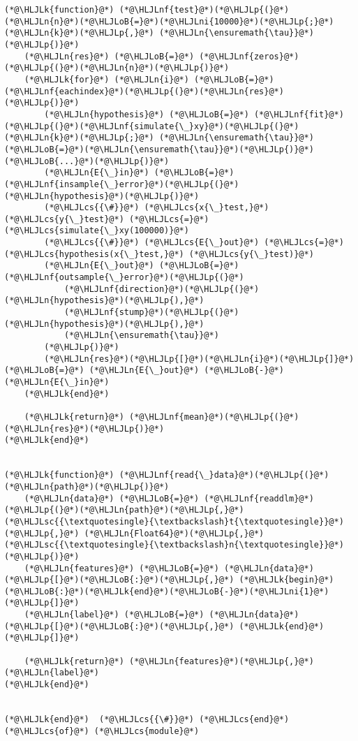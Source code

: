 \documentclass[12pt,a4paper]{article}
\newcommand{\HLJLk}[1]{\textcolor[RGB]{148,91,176}{\textbf{#1}}}
\newcommand{\HLJLn}[1]{#1}
\newcommand{\HLJLnf}[1]{\textcolor[RGB]{66,102,213}{#1}}
\newcommand{\HLJLsc}[1]{\textcolor[RGB]{201,61,57}{#1}}
\newcommand{\HLJLni}[1]{\textcolor[RGB]{59,151,46}{#1}}
\newcommand{\HLJLoB}[1]{\textcolor[RGB]{102,102,102}{\textbf{#1}}}
\newcommand{\HLJLp}[1]{#1}
\newcommand{\HLJLcs}[1]{\textcolor[RGB]{153,153,119}{\textit{#1}}}
\begin{document}
\begin{lstlisting}
(*@\HLJLk{function}@*) (*@\HLJLnf{test}@*)(*@\HLJLp{(}@*)(*@\HLJLn{n}@*)(*@\HLJLoB{=}@*)(*@\HLJLni{10000}@*)(*@\HLJLp{;}@*) (*@\HLJLn{k}@*)(*@\HLJLp{,}@*) (*@\HLJLn{\ensuremath{\tau}}@*)(*@\HLJLp{)}@*)
    (*@\HLJLn{res}@*) (*@\HLJLoB{=}@*) (*@\HLJLnf{zeros}@*)(*@\HLJLp{(}@*)(*@\HLJLn{n}@*)(*@\HLJLp{)}@*)
    (*@\HLJLk{for}@*) (*@\HLJLn{i}@*) (*@\HLJLoB{=}@*) (*@\HLJLnf{eachindex}@*)(*@\HLJLp{(}@*)(*@\HLJLn{res}@*)(*@\HLJLp{)}@*)
        (*@\HLJLn{hypothesis}@*) (*@\HLJLoB{=}@*) (*@\HLJLnf{fit}@*)(*@\HLJLp{(}@*)(*@\HLJLnf{simulate{\_}xy}@*)(*@\HLJLp{(}@*)(*@\HLJLn{k}@*)(*@\HLJLp{;}@*) (*@\HLJLn{\ensuremath{\tau}}@*)(*@\HLJLoB{=}@*)(*@\HLJLn{\ensuremath{\tau}}@*)(*@\HLJLp{)}@*)(*@\HLJLoB{...}@*)(*@\HLJLp{)}@*)
        (*@\HLJLn{E{\_}in}@*) (*@\HLJLoB{=}@*) (*@\HLJLnf{insample{\_}error}@*)(*@\HLJLp{(}@*)(*@\HLJLn{hypothesis}@*)(*@\HLJLp{)}@*)
        (*@\HLJLcs{{\#}}@*) (*@\HLJLcs{x{\_}test,}@*) (*@\HLJLcs{y{\_}test}@*) (*@\HLJLcs{=}@*) (*@\HLJLcs{simulate{\_}xy(100000)}@*)
        (*@\HLJLcs{{\#}}@*) (*@\HLJLcs{E{\_}out}@*) (*@\HLJLcs{=}@*) (*@\HLJLcs{hypothesis(x{\_}test,}@*) (*@\HLJLcs{y{\_}test)}@*)
        (*@\HLJLn{E{\_}out}@*) (*@\HLJLoB{=}@*) (*@\HLJLnf{outsample{\_}error}@*)(*@\HLJLp{(}@*)
            (*@\HLJLnf{direction}@*)(*@\HLJLp{(}@*)(*@\HLJLn{hypothesis}@*)(*@\HLJLp{),}@*) 
            (*@\HLJLnf{stump}@*)(*@\HLJLp{(}@*)(*@\HLJLn{hypothesis}@*)(*@\HLJLp{),}@*) 
            (*@\HLJLn{\ensuremath{\tau}}@*)
        (*@\HLJLp{)}@*)
        (*@\HLJLn{res}@*)(*@\HLJLp{[}@*)(*@\HLJLn{i}@*)(*@\HLJLp{]}@*) (*@\HLJLoB{=}@*) (*@\HLJLn{E{\_}out}@*) (*@\HLJLoB{-}@*) (*@\HLJLn{E{\_}in}@*)
    (*@\HLJLk{end}@*)
    
    (*@\HLJLk{return}@*) (*@\HLJLnf{mean}@*)(*@\HLJLp{(}@*)(*@\HLJLn{res}@*)(*@\HLJLp{)}@*)
(*@\HLJLk{end}@*)


(*@\HLJLk{function}@*) (*@\HLJLnf{read{\_}data}@*)(*@\HLJLp{(}@*)(*@\HLJLn{path}@*)(*@\HLJLp{)}@*)
    (*@\HLJLn{data}@*) (*@\HLJLoB{=}@*) (*@\HLJLnf{readdlm}@*)(*@\HLJLp{(}@*)(*@\HLJLn{path}@*)(*@\HLJLp{,}@*) (*@\HLJLsc{{\textquotesingle}{\textbackslash}t{\textquotesingle}}@*)(*@\HLJLp{,}@*) (*@\HLJLn{Float64}@*)(*@\HLJLp{,}@*) (*@\HLJLsc{{\textquotesingle}{\textbackslash}n{\textquotesingle}}@*)(*@\HLJLp{)}@*)
    (*@\HLJLn{features}@*) (*@\HLJLoB{=}@*) (*@\HLJLn{data}@*)(*@\HLJLp{[}@*)(*@\HLJLoB{:}@*)(*@\HLJLp{,}@*) (*@\HLJLk{begin}@*)(*@\HLJLoB{:}@*)(*@\HLJLk{end}@*)(*@\HLJLoB{-}@*)(*@\HLJLni{1}@*)(*@\HLJLp{]}@*)
    (*@\HLJLn{label}@*) (*@\HLJLoB{=}@*) (*@\HLJLn{data}@*)(*@\HLJLp{[}@*)(*@\HLJLoB{:}@*)(*@\HLJLp{,}@*) (*@\HLJLk{end}@*)(*@\HLJLp{]}@*)
    
    (*@\HLJLk{return}@*) (*@\HLJLn{features}@*)(*@\HLJLp{,}@*) (*@\HLJLn{label}@*)
(*@\HLJLk{end}@*)


(*@\HLJLk{end}@*)  (*@\HLJLcs{{\#}}@*) (*@\HLJLcs{end}@*) (*@\HLJLcs{of}@*) (*@\HLJLcs{module}@*)
\end{lstlisting}
\end{document}
